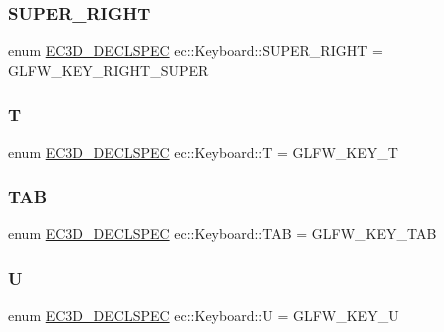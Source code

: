 \subsubsection{\texorpdfstring{S\+U\+P\+E\+R\+\_\+\+R\+I\+G\+HT}{SUPER\_RIGHT}}
{\footnotesize\ttfamily enum \mbox{\hyperlink{_common_8h_aac42573e202ca3dd4d259c81691e2369}{E\+C3\+D\+\_\+\+D\+E\+C\+L\+S\+P\+EC}} ec\+::\+Keyboard\+::\+S\+U\+P\+E\+R\+\_\+\+R\+I\+G\+HT = G\+L\+F\+W\+\_\+\+K\+E\+Y\+\_\+\+R\+I\+G\+H\+T\+\_\+\+S\+U\+P\+ER}

\mbox{\label{classec_1_1_keyboard_a09f863373edf51f09e94316f13dad263}} 
\subsubsection{\texorpdfstring{T}{T}}
{\footnotesize\ttfamily enum \mbox{\hyperlink{_common_8h_aac42573e202ca3dd4d259c81691e2369}{E\+C3\+D\+\_\+\+D\+E\+C\+L\+S\+P\+EC}} ec\+::\+Keyboard\+::T = G\+L\+F\+W\+\_\+\+K\+E\+Y\+\_\+T}

\mbox{\label{classec_1_1_keyboard_aef71873ca11f1076aaad6ea11d3d8aea}} 
\subsubsection{\texorpdfstring{T\+AB}{TAB}}
{\footnotesize\ttfamily enum \mbox{\hyperlink{_common_8h_aac42573e202ca3dd4d259c81691e2369}{E\+C3\+D\+\_\+\+D\+E\+C\+L\+S\+P\+EC}} ec\+::\+Keyboard\+::\+T\+AB = G\+L\+F\+W\+\_\+\+K\+E\+Y\+\_\+\+T\+AB}

\mbox{\label{classec_1_1_keyboard_a766e2c870a29b0e0cfdf87346126f9aa}} 
\subsubsection{\texorpdfstring{U}{U}}
{\footnotesize\ttfamily enum \mbox{\hyperlink{_common_8h_aac42573e202ca3dd4d259c81691e2369}{E\+C3\+D\+\_\+\+D\+E\+C\+L\+S\+P\+EC}} ec\+::\+Keyboard\+::U = G\+L\+F\+W\+\_\+\+K\+E\+Y\+\_\+U}

\mbox{\label{classec_1_1_keyboard_a6da2eed1074dc9feaf4b68ab3da684d8}} 
